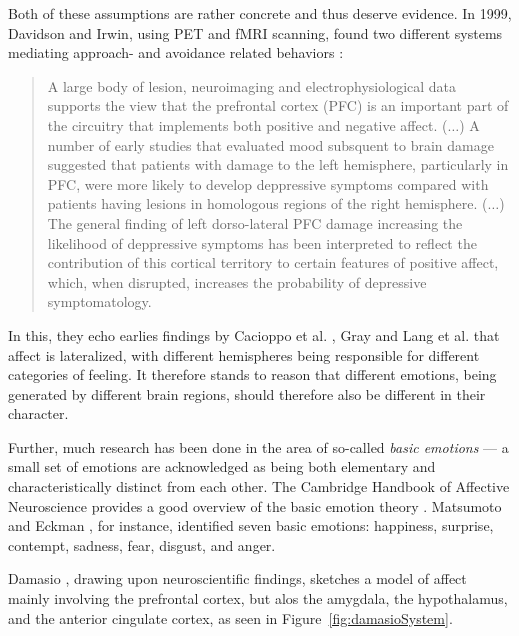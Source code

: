 \documentclass[]{scrartcl}
\theoremstyle{break}
\begin{document}
Both of these assumptions are rather concrete and thus deserve evidence. In 1999, Davidson and Irwin, using PET and fMRI scanning, found two different systems mediating approach- and avoidance related behaviors \cite[p. 13]{davidson1999}:

\begin{quote}
A large body of lesion, neuroimaging and electrophysiological data supports the view that the prefrontal cortex (PFC) is an important part of the circuitry that implements both positive and negative affect. ($\dots$)
A number of early studies that evaluated mood subsquent to brain damage suggested that patients with damage to the left hemisphere, particularly in PFC, were more likely to develop deppressive symptoms compared with patients having lesions in homologous regions of the right hemisphere. ($\dots$)
The general finding of left dorso-lateral PFC damage increasing the likelihood of deppressive symptoms has been interpreted to reflect the contribution of this cortical territory to certain features of positive affect, which, when disrupted, increases the probability of depressive symptomatology.
\end{quote}

In this, they echo earlies findings by Cacioppo et al. \cite{cacioppo1999}, Gray \cite{gray1994} and Lang et al. \cite{lang1990} that affect is lateralized, with different hemispheres being responsible for different categories of feeling. It therefore stands to reason that different emotions, being generated by different brain regions, should therefore also be different in their character.

Further, much research has been done in the area of so-called {\em basic emotions} --- a small set of emotions are acknowledged as being both elementary and characteristically distinct from each other. The Cambridge Handbook of Affective Neuroscience provides a good overview of the basic emotion theory \cite[pp. 9-10]{cambridgeAff}. Matsumoto and Eckman \cite{matsumoto2009}, for instance, identified seven basic emotions: happiness, surprise, contempt, sadness, fear, disgust, and anger.

Damasio \cite{damasio1998}, drawing upon neuroscientific findings, sketches a model of affect mainly involving the prefrontal cortex, but alos the amygdala, the hypothalamus, and the anterior cingulate cortex, as seen in Figure~\ref{fig:damasioSystem}.
\end{document}
